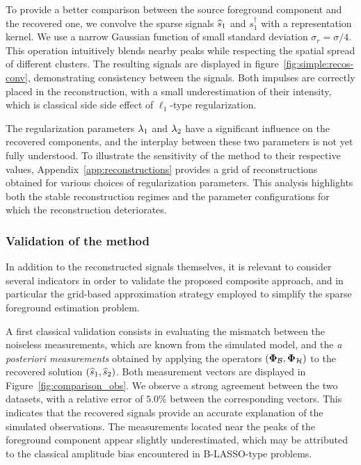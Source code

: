 \documentclass[12pt]{article}
\begin{document}
        To provide a better comparison between the source foreground component and the recovered one, we convolve the sparse signals $\widehat{s}_1$ and $s_1^\dagger$ with a representation kernel. We use a narrow Gaussian function of small standard deviation $\sigma_r = \sigma/4$. This operation intuitively blends nearby peaks while respecting the spatial spread of different clusters. The resulting signals are displayed in figure~\ref{fig:simple:recos-conv}, demonstrating consistency between the signals. Both impulses are correctly placed in the reconstruction, with a small underestimation of their intensity, which is classical side side effect of $\ell_1$-type regularization.

        The regularization parameters $\lambda_{1}$ and $\lambda_{2}$ have a significant influence on the recovered components, and the interplay between these two parameters is not yet fully understood. To illustrate the sensitivity of the method to their respective values, Appendix~\ref{app:reconstructions} provides a grid of reconstructions obtained for various choices of regularization parameters. This analysis highlights both the stable reconstruction regimes and the parameter configurations for which the reconstruction deteriorates.

        \subsubsection{Validation of the method}

        In addition to the reconstructed signals themselves, it is relevant to consider several indicators in order to validate the proposed composite approach, and in particular the grid-based approximation strategy employed to simplify the sparse foreground estimation problem.

        A first classical validation consists in evaluating the mismatch between the noiseless measurements, which are known from the simulated model, and the \emph{a posteriori measurements} obtained by applying the operators $(\bm{\Phi}_\mathcal{B}, \bm{\Phi}_\mathcal{H})$ to the recovered solution $(\widehat{s}_1, \widehat{s}_2)$. Both measurement vectors are displayed in Figure~\ref{fig:comparison_obs}. We observe a strong agreement between the two datasets, with a relative error of $5.0$\% between the corresponding vectors. This indicates that the recovered signals provide an accurate explanation of the simulated observations. The measurements located near the peaks of the foreground component appear slightly underestimated, which may be attributed to the classical amplitude bias encountered in B-LASSO-type problems.
\end{document}
